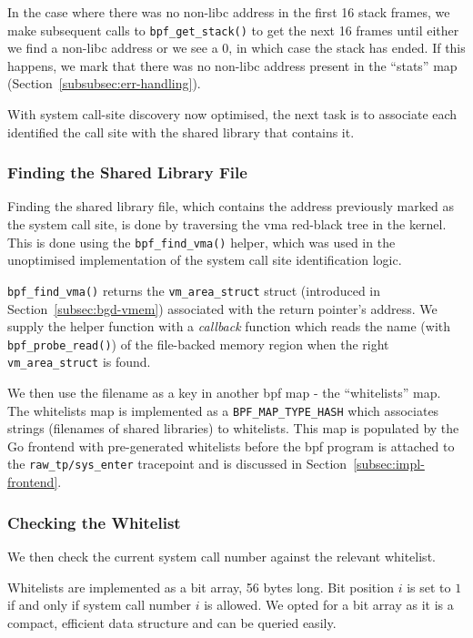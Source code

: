 In the case where there was no non-\ac{libc} address in the first 16 stack
frames, we make subsequent calls to \texttt{bpf\_get\_stack()} to get the next
16 frames until either we find a non-\ac{libc} address or we see a 0, in which
case the stack has ended. If this happens, we mark that there was no
non-\ac{libc} address present in the ``stats'' map
(Section~\ref{subsubsec:err-handling}).

With system call-site discovery now optimised, the next task is to associate each 
identified the call site with the shared library that contains it.

\subsubsection{Finding the Shared Library File}\label{subsec:impl-find-vma}

Finding the shared library file, which contains the address previously marked as
the system call site, is done by traversing the \ac{vma} red-black tree in the
kernel. This is done using the \texttt{bpf\_find\_vma()} helper, which was used
in the unoptimised implementation of the system call site identification logic.

\texttt{bpf\_find\_vma()} returns the \texttt{vm\_area\_struct} struct
(introduced in Section~\ref{subsec:bgd-vmem}) associated with the
return pointer's address. We supply the helper function with a \textit{callback}
function which reads the name (with \texttt{bpf\_probe\_read()}) of the file-backed memory region when the right
\texttt{vm\_area\_struct} is found.

We then use the filename as a key in another \ac{bpf} map - the ``whitelists''
map. The whitelists map is implemented as a \texttt{BPF\_MAP\_TYPE\_HASH} which associates strings (filenames
of shared libraries) to whitelists. This map is populated by the Go frontend
with pre-generated whitelists before the \ac{bpf} program is attached to the 
\texttt{raw\_tp/sys\_enter} tracepoint and is discussed in 
Section~\ref{subsec:impl-frontend}.

\subsubsection{Checking the Whitelist}

We then check the current system call number against the relevant whitelist.

Whitelists are implemented as a bit array, 56 bytes long. Bit position $i$ is
set to $1$ if and only if system call number $i$ is allowed. We opted for a bit
array as it is a compact, efficient data structure and can be queried easily.

